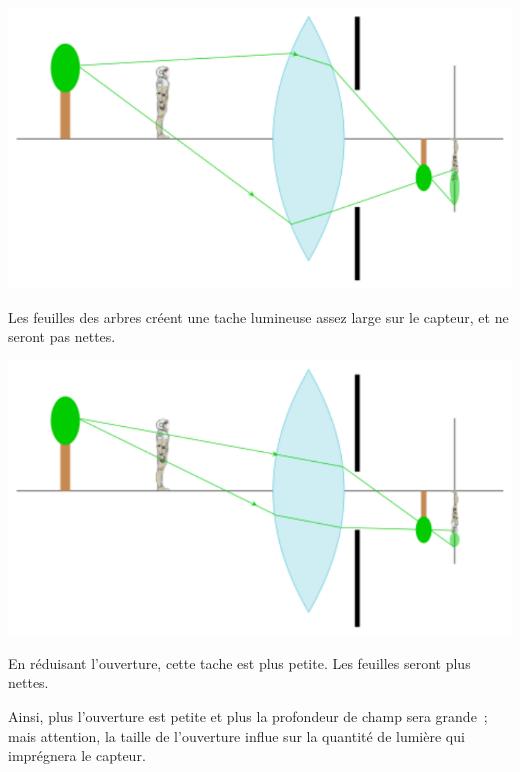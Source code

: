 \documentclass[../../main/main.tex]{subfiles}
\begin{document}

\noindent
\begin{minipage}{0.48\linewidth}
	\begin{center}
		\includegraphics[width=.8\linewidth]{pfd_chp_ouverture-a}
	\end{center}
	Les feuilles des arbres créent une tache lumineuse assez large sur le capteur,
	et ne seront pas nettes.
\end{minipage}
\hfill
\begin{minipage}{0.48\linewidth}
	\begin{center}
		\includegraphics[width=.8\linewidth]{pfd_chp_ouverture-b}
	\end{center}
	En réduisant l'ouverture, cette tache est plus petite. Les feuilles seront
	plus nettes.
\end{minipage}

\bigbreak


Ainsi, plus l'ouverture est petite et plus la profondeur de champ sera
grande~; mais attention, la taille de l'ouverture influe sur la quantité de
lumière qui imprégnera le capteur.
\end{document}
